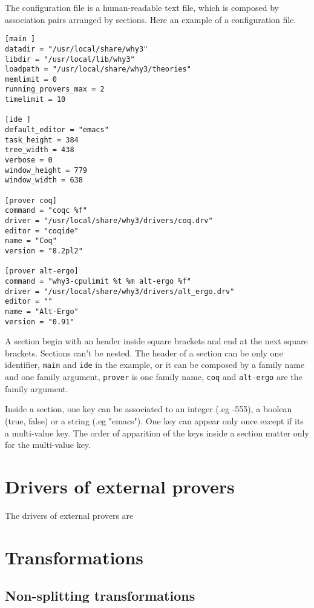 The configuration file is a human-readable text file, which is
composed by association pairs arranged by sections. Here an example of
a configuration file.

\begin{verbatim}
[main ]
datadir = "/usr/local/share/why3"
libdir = "/usr/local/lib/why3"
loadpath = "/usr/local/share/why3/theories"
memlimit = 0
running_provers_max = 2
timelimit = 10

[ide ]
default_editor = "emacs"
task_height = 384
tree_width = 438
verbose = 0
window_height = 779
window_width = 638

[prover coq]
command = "coqc %f"
driver = "/usr/local/share/why3/drivers/coq.drv"
editor = "coqide"
name = "Coq"
version = "8.2pl2"

[prover alt-ergo]
command = "why3-cpulimit %t %m alt-ergo %f"
driver = "/usr/local/share/why3/drivers/alt_ergo.drv"
editor = ""
name = "Alt-Ergo"
version = "0.91"
\end{verbatim}

A section begin with an header inside square brackets and end at the
next square brackets. Sections can't be nested. The header of a
section can be only one identifier, \texttt{main} and \texttt{ide} in
the example, or it can be composed by a family name and one family
argument, \texttt{prover} is one family name, \texttt{coq} and
\texttt{alt-ergo} are the family argument.


Inside a section, one key can be associated to an integer (.eg -555),
a boolean (true, false) or a string (.eg "emacs"). One key can appear
only once except if its a multi-value key. The order of apparition of
the keys inside a section matter only for the multi-value key.

\section{Drivers of external provers}
The drivers of external provers are 

\section{Transformations}
\label{sec:transformations}

\subsection{Non-splitting transformations}

